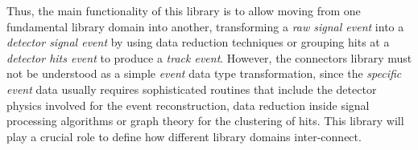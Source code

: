 Thus, the main functionality of this library is to allow moving from one fundamental library domain into another, transforming a \emph{raw signal event} into a \emph{detector signal event} by using data reduction techniques or grouping hits at a \emph{detector hits event} to produce a \emph{track event}. However, the connectors library must not be understood as a simple \emph{event} data type transformation, since the \emph{specific event} data usually requires sophisticated routines that include the detector physics involved for the event reconstruction, data reduction inside signal processing algorithms or graph theory for the clustering of hits. This library will play a crucial role to define how different library domains inter-connect.


